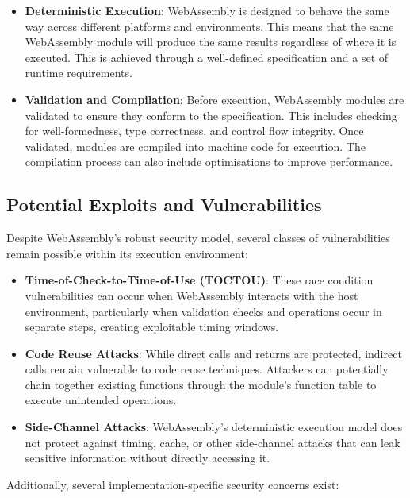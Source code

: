 \documentclass{article}
\begin{document}
\begin{itemize}
    \item \textbf{Deterministic Execution}: WebAssembly is designed to behave the same way across different platforms and environments. This means that the same WebAssembly module will produce the same results regardless of where it is executed. This is achieved through a well-defined specification and a set of runtime requirements.
    \item \textbf{Validation and Compilation}: Before execution, WebAssembly modules are validated to ensure they conform to the specification. This includes checking for well-formedness, type correctness, and control flow integrity. Once validated, modules are compiled into machine code for execution. The compilation process can also include optimisations to improve performance.
\end{itemize}

\subsection{Potential Exploits and Vulnerabilities}
Despite WebAssembly's robust security model, several classes of vulnerabilities remain possible within its execution environment:

\begin{itemize}
    \item \textbf{Time-of-Check-to-Time-of-Use (TOCTOU)}: These race condition vulnerabilities can occur when WebAssembly interacts with the host environment, particularly when validation checks and operations occur in separate steps, creating exploitable timing windows.
    
    \item \textbf{Code Reuse Attacks}: While direct calls and returns are protected, indirect calls remain vulnerable to code reuse techniques. Attackers can potentially chain together existing functions through the module's function table to execute unintended operations.
    
    \item \textbf{Side-Channel Attacks}: WebAssembly's deterministic execution model does not protect against timing, cache, or other side-channel attacks that can leak sensitive information without directly accessing it.
\end{itemize}

Additionally, several implementation-specific security concerns exist:
\end{document}
